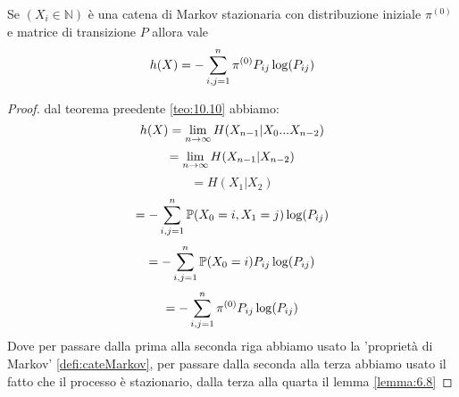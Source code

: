 \begin{teo}
Se $(X_i\in \mathbb{N})$ è una catena di Markov stazionaria con distribuzione iniziale $\pi^{(0)}$ e matrice di transizione $P$ allora vale
\begin{equation}
h(X)=-\sum_{i,j=1}^n \pi^{(0)} P_{ij} \log (P_{ij})
\end{equation}
\end{teo}
\begin{proof}
dal teorema preedente \ref{teo:10.10} abbiamo:
$$h(X)=\lim_{n\to \infty} H(X_{n-1}|X_0...X_{n-2})$$
$$=\lim_{n\to \infty} H(X_{n-1}|X_{n-2})$$
$$=H(X_1|X_2)$$
$$=-\sum_{i,j=1}^n \mathbb{P}(X_0=i,X_1=j)\log (P_{ij})$$
$$=-\sum_{i,j=1}^n \mathbb{P}(X_0=i)P_{ij}\log (P_{ij})$$
$$=-\sum_{i,j=1}^n \pi^{(0)}P_{ij}\log (P_{ij})$$
Dove per passare dalla prima alla seconda riga abbiamo usato la 'proprietà di Markov' \ref{defi:cateMarkov}, per passare dalla seconda alla terza abbiamo usato il fatto che il processo è stazionario, dalla terza alla quarta il lemma \ref{lemma:6.8}
\end{proof}





